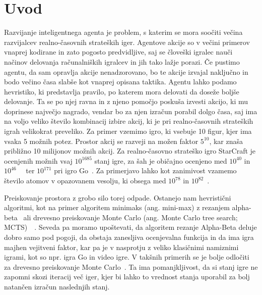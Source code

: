 \documentclass[a4paper, 12pt]{book}
\begin{document}
\mainmatter
\setcounter{page}{1}
\pagestyle{fancy}



\chapter{Uvod}

Razvijanje inteligentnega agenta je problem, s katerim se mora soočiti večina razvijalcev realno-časovnih strateških iger. 
Agentove akcije so v večini primerov vnaprej kodirane in zato pogosto predvidljive, saj se človeški igralec nauči načinov delovanja računalniških igralcev in jih tako lažje porazi.
Če pustimo agentu, da sam opravlja akcije nenadzorovano, bo te akcije izvajal naključno in bodo večino časa slabše kot vnaprej opisana taktika.
Agentu lahko podamo hevristiko, ki predstavlja pravilo, po katerem mora delovati da doseže boljše delovanje.
Ta se po njej ravna in z njeno pomočjo poskuša izvesti akcijo, ki mu doprinese največjo nagrado, vendar bo za njen izračun porabil dolgo časa, saj ima na voljo veliko število kombinacij izbire akcij, ki je pri realno-časovnih strateških igrah velikokrat preveliko.
Za primer vzemimo igro, ki vsebuje 10 figur, kjer ima vsaka 5 možnih potez.
Prostor akcij se razveji na možen faktor $5^{10}$, kar znaša približno 10 milijonov možnih akcij.
Za realno-časovno strateško igro StarCraft je ocenjenih možnih vsaj $10^{1685}$ stanj igre, za šah je običajno ocenjeno med $10^{40}$ in $10^{46}$~{\cite{chinchalkar1996upper}}~{\cite{steinerberger2015number}} ter $10^{171}$ pri igro Go~\cite{ontanon2017combinatorial}.
Za primerjavo lahko kot zanimivost vzamemo število atomov v opazovanem vesolju, ki obsega med $10^{78}$ in $10^{82}$~\cite{atoms}.

Preiskovanje prostora z grobo silo torej odpade. 
Ostanejo nam hevristični algoritmi, kot na primer algoritem minimaks (ang. mini-max) z rezanjem alpha-beta~{\cite{knuth1975analysis}} ali drevesno preiskovanje Monte Carlo (ang. Monte Carlo tree search; MCTS)~{\cite{kocsis2006bandit}}~{\cite{coulom2006efficient}}. 
Seveda pa moramo upoštevati, da algoritem rezanje Alpha-Beta deluje dobro samo pod pogoji, da obstaja zanesljiva ocenjevalna funkcija in da ima igra majhen vejitveni faktor, kar pa je v nasprotju z veliko klasičnimi namiznimi igrami, kot so npr. igra Go in video igre. 
V takšnih primerih se je bolje odločiti za drevesno preiskovanje Monte Carlo~\cite{chaslot2008monte}.
Ta ima pomanjkljivost, da si stanj igre ne zapomni skozi iteracij več iger, kjer bi lahko to vrednost stanja uporabil za bolj natančen izračun naslednjih stanj.
\end{document}
